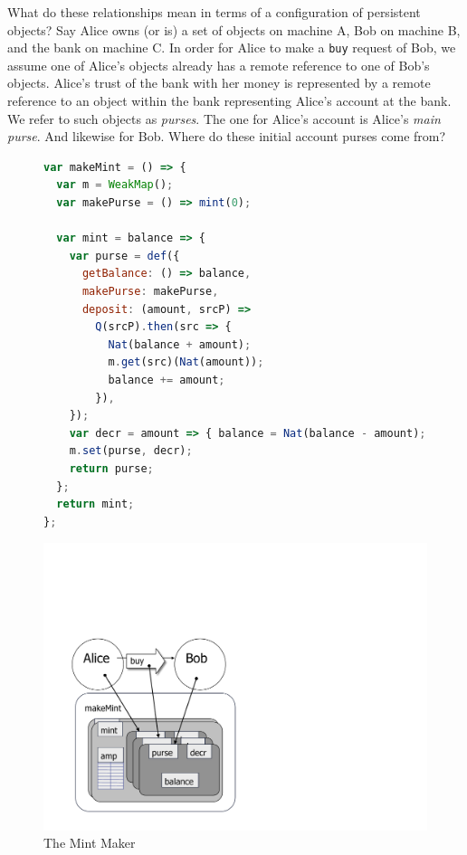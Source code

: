 \documentclass{llncs}
\begin{document}
What do these relationships mean in terms of a configuration of persistent objects? Say Alice owns (or is) a set of objects on machine A, Bob on machine B, and the bank on machine C. In order for Alice to make a {\tt buy} request of Bob, we assume one of Alice's objects already has a remote reference to one of Bob's objects. Alice's trust of the bank with her money is represented by a remote reference to an object within the bank representing Alice's account at the bank. We refer to such objects as \emph{purses}. The one for Alice's account is Alice's \emph{main purse}. And likewise for Bob. Where do these initial account purses come from?

\begin{figure}[t]
\begin{minipage}[t]{0.54\linewidth}
\begin{lstlisting}[language=javascript]
var makeMint = () => {
  var m = WeakMap();
  var makePurse = () => mint(0);
  
  var mint = balance => {
    var purse = def({
      getBalance: () => balance,
      makePurse: makePurse,
      deposit: (amount, srcP) =>
        Q(srcP).then(src => {
          Nat(balance + amount);
          m.get(src)(Nat(amount)); 
          balance += amount;
        }),
    });
    var decr = amount => { balance = Nat(balance - amount); };
    m.set(purse, decr);
    return purse;
  };
  return mint;
};
\end{lstlisting}
\end{minipage}
\begin{minipage}[t]{0.48\linewidth}
\vspace{0pt}
\includegraphics[scale=0.3]{bw-mint.pdf}
\end{minipage}
\caption{The Mint Maker}
\label{makeMint}
\end{figure}
\end{document}
